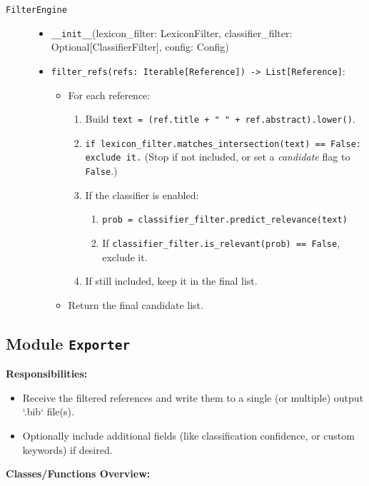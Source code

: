\documentclass[12pt]{article}
\begin{document}
\begin{description}
  \item[\texttt{FilterEngine}]
  \begin{itemize}
    \item \texttt{\_\_init\_\_}(lexicon\_filter: LexiconFilter, classifier\_filter: Optional[ClassifierFilter], config: Config)
    \item \texttt{filter\_refs(refs: Iterable[Reference]) -> List[Reference]}:
    \begin{itemize}
      \item For each reference:
        \begin{enumerate}
          \item Build \texttt{text = (ref.title + " " + ref.abstract).lower()}.
          \item \texttt{if lexicon\_filter.matches\_intersection(text) == False: exclude it.} (Stop if not included, or set a \emph{candidate} flag to \texttt{False}.)
          \item If the classifier is enabled:
            \begin{enumerate}
              \item \texttt{prob = classifier\_filter.predict\_relevance(text)}
              \item If \texttt{classifier\_filter.is\_relevant(prob) == False}, exclude it.
            \end{enumerate}
          \item If still included, keep it in the final list.
        \end{enumerate}
      \item Return the final candidate list.
    \end{itemize}
  \end{itemize}
\end{description}

\subsection{Module \texttt{Exporter}}
\textbf{Responsibilities:}
\begin{itemize}
  \item Receive the filtered references and write them to a single (or multiple) output `.bib` file(s).
  \item Optionally include additional fields (like classification confidence, or custom keywords) if desired.
\end{itemize}

\textbf{Classes/Functions Overview:}
\end{document}
